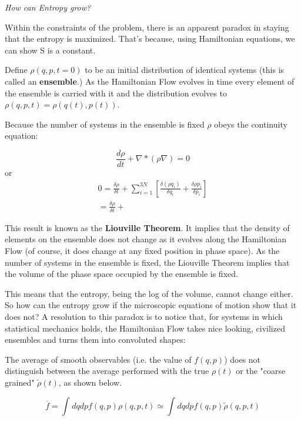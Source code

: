 \documentclass{article}
\newcommand{\pardif}[2]{\frac{\delta#1}{\delta#2}}
\newcommand{\dif}[2]{\frac{d#1}{d#2}}
\begin{document}
\textit{How can Entropy grow?}

Within the constraints of the problem, there is an apparent paradox in staying that the entropy is maximized.  That's because, using Hamiltonian equations, we can show S is a constant.

Define $\rho(q,p,t=0)$ to be an initial distribution of identical systems (this is called an \textbf{ensemble}.)  As the Hamiltonian Flow evolves in time every element of the ensemble is carried with it and the distribution evolves to $\rho(q,p,t)=\rho(q(t),p(t))$.


Because the number of systems in the ensemble is fixed $\rho$ obeys the continuity equation:

$$\dif{\rho}{t}+\nabla*(\rho\nabla)=0$$
or
\begin{equation}
\begin{split}
0=\pardif{\rho}{t}+\sum_{i=1}^{3N}[\pardif{(\rho\dot{q_{i}})}{q_{i}}+\pardif{\rho\dot{p_{i}}}{p_{i}}] \\
	=\pardif{\rho}{t}+
\end{split}	 
\end{equation}

This result is known as the \textbf{Liouville Theorem}.  It implies that the density of elements on the ensemble does not change as it evolves along the Hamiltonian Flow (of course, it does change at any fixed position in phase space).  As the number of systems in the ensemble is fixed, the Liouville Theorem implies that the volume of the phase space occupied by the ensemble is fixed.  

This means that the entropy, being the log of the volume, cannot change either.  So how can the entropy grow if the microscopic equations of motion show that it does not?  A resolution to this paradox is to notice that, for systems in which statistical mechanics holds, the Hamiltonian Flow takes nice looking, civilized ensembles and turns them into convoluted shapes:


The average of smooth observables (i.e. the value of $f(q,p)$) does not distinguish between the average performed with the true $\rho(t)$ or the "coarse grained" $\widetilde{\rho}(t)$, as shown below.


$$\overline{f}=\int_{}^{}dqdpf(q,p)\rho(q,p,t)\simeq\int_{}^{}dqdpf(q,p)\widetilde{\rho}(q,p,t)$$
\end{document}
